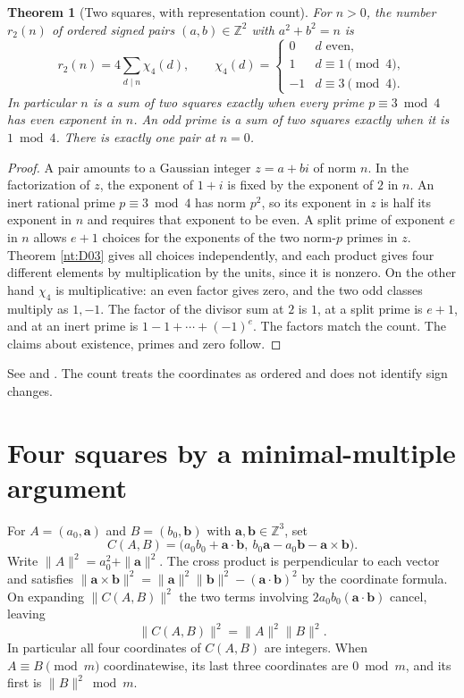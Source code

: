 \documentclass[11pt,oneside,openany]{book}
\theoremstyle{plain}
\newtheorem{theorem}{Theorem}[chapter]
\theoremstyle{definition}
\theoremstyle{remark}
\begin{document}
\begin{theorem}[Two squares, with representation count]\label{nt:D04}
For \(n>0\), the number \(r_2(n)\) of ordered signed pairs
\((a,b)\in\mathbb Z^2\) with \(a^2+b^2=n\) is
\[
 r_2(n)=4\sum_{d\mid n}\chi_4(d),\qquad
 \chi_4(d)=
 \begin{cases}
 0&d\text{ even},\\
 1&d\equiv1\pmod4,\\
 -1&d\equiv3\pmod4.
 \end{cases}
\]
In particular \(n\) is a sum of two squares exactly when every prime
\(p\equiv3\bmod4\) has even exponent in \(n\). An odd prime is a sum
of two squares exactly when it is \(1\bmod4\). There is exactly one
pair at \(n=0\).
\end{theorem}
\begin{proof}
A pair amounts to a Gaussian integer \(z=a+bi\) of norm \(n\).
In the factorization of \(z\), the exponent of \(1+i\) is fixed
by the exponent of \(2\) in \(n\). An inert rational prime
\(p\equiv3\bmod4\) has norm \(p^2\), so its exponent in \(z\) is
half its exponent in \(n\) and requires that exponent to be even.
A split prime of exponent \(e\) in \(n\) allows \(e+1\) choices
for the exponents of the two norm-\(p\) primes in \(z\). Theorem
\ref{nt:D03} gives all choices independently, and each product gives
four different elements by multiplication by the units, since it is
nonzero. On the other hand \(\chi_4\) is multiplicative: an even
factor gives zero, and the two odd classes multiply as \(1,-1\).
The factor of the divisor sum at \(2\) is \(1\), at a split prime is
\(e+1\), and at an inert prime is \(1-1+\cdots+(-1)^e\).
The factors match the count. The claims about existence, primes and
zero follow.
\end{proof}
See \cite[Chapters XII and XX]{hardy-wright} and
\cite[Section 3.6, Theorems 3.20--3.22 and Corollary 3.23]{nzm}.
The count treats the coordinates as ordered and does not identify
sign changes.

\section{Four squares by a minimal-multiple argument}

For \(A=(a_0,\mathbf a)\) and \(B=(b_0,\mathbf b)\) with
\(\mathbf a,\mathbf b\in\mathbb Z^3\), set
\[
 C(A,B)=
 \bigl(a_0b_0+\mathbf a\mathbin{\cdot}\mathbf b,\ 
       b_0\mathbf a-a_0\mathbf b-\mathbf a\times\mathbf b\bigr).
\]
Write \(\|A\|^2=a_0^2+\|\mathbf a\|^2\).
The cross product is perpendicular to each vector and satisfies
\(\|\mathbf a\times\mathbf b\|^2=
\|\mathbf a\|^2\|\mathbf b\|^2-(\mathbf a\cdot\mathbf b)^2\)
by the coordinate formula. On expanding \(\|C(A,B)\|^2\) the two
terms involving \(2a_0b_0(\mathbf a\cdot\mathbf b)\) cancel,
leaving
\begin{equation}\label{eq:nt-four-square-product}
 \|C(A,B)\|^2=\|A\|^2\|B\|^2.
\end{equation}
In particular all four coordinates of \(C(A,B)\) are integers.
When \(A\equiv B\pmod m\) coordinatewise, its last three coordinates
are \(0\bmod m\), and its first is \(\|B\|^2\bmod m\).
\end{document}
